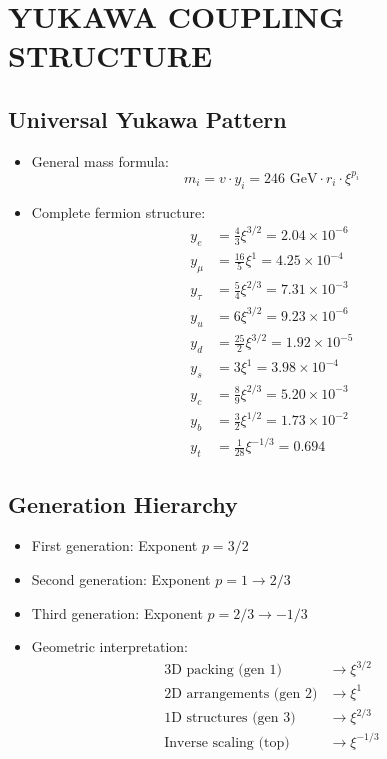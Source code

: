 \documentclass[12pt,a4paper]{article}
\begin{document}
\section{YUKAWA COUPLING STRUCTURE}

\subsection{Universal Yukawa Pattern}
\begin{itemize}
	\item General mass formula:
	$$m_i = v \cdot y_i = 246 \text{ GeV} \cdot r_i \cdot \xi^{p_i}$$
	
	\item Complete fermion structure:
	\begin{align*}
		y_e &= \frac{4}{3}\xi^{3/2} = 2.04 \times 10^{-6}\\
		y_\mu &= \frac{16}{5}\xi^1 = 4.25 \times 10^{-4}\\
		y_\tau &= \frac{5}{4}\xi^{2/3} = 7.31 \times 10^{-3}\\
		y_u &= 6\xi^{3/2} = 9.23 \times 10^{-6}\\
		y_d &= \frac{25}{2}\xi^{3/2} = 1.92 \times 10^{-5}\\
		y_s &= 3\xi^1 = 3.98 \times 10^{-4}\\
		y_c &= \frac{8}{9}\xi^{2/3} = 5.20 \times 10^{-3}\\
		y_b &= \frac{3}{2}\xi^{1/2} = 1.73 \times 10^{-2}\\
		y_t &= \frac{1}{28}\xi^{-1/3} = 0.694
	\end{align*}
\end{itemize}

\subsection{Generation Hierarchy}
\begin{itemize}
	\item First generation: Exponent $p = 3/2$
	\item Second generation: Exponent $p = 1 \rightarrow 2/3$
	\item Third generation: Exponent $p = 2/3 \rightarrow -1/3$
	
	\item Geometric interpretation:
	\begin{align*}
		\text{3D packing (gen 1)} &\rightarrow \xi^{3/2}\\
		\text{2D arrangements (gen 2)} &\rightarrow \xi^1\\
		\text{1D structures (gen 3)} &\rightarrow \xi^{2/3}\\
		\text{Inverse scaling (top)} &\rightarrow \xi^{-1/3}
	\end{align*}
\end{itemize}
\end{document}
